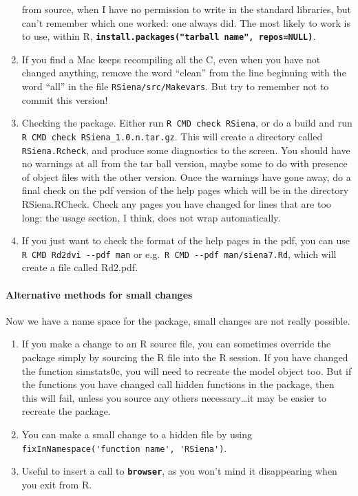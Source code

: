 \documentclass[12pt, a4paper]{article}
\renewcommand{\=}{\,=\,}
\newcommand{\+}{\,+\,}
\newcommand{\sfn}[1]{\textbf{\texttt{#1}}}
\begin{document}
\begin{enumerate}
  from source, when I have no permission to write in the standard libraries, but
  can't remember which one worked: one always did. The most likely to work is to
  use, within R, \sfn{install.packages("tarball name", repos=NULL)}.
\item If you find a Mac keeps recompiling all the C, even when you have not
  changed anything, remove the word ``clean'' from the line beginning with the
  word ``all'' in the file \verb|RSiena/src/Makevars|. But try to remember not
  to commit this version!
\item Checking the package. Either run \verb|R CMD check RSiena|, or do a build
  and run \verb|R CMD check RSiena_1.0.n.tar.gz|. This will create a directory
  called \verb|RSiena.Rcheck|, and produce some diagnostics to the screen. You
  should have no warnings at all from the tar ball version, maybe some to do
  with presence of object files with the other version. Once the warnings have
  gone away, do a final check on the pdf version of the help pages which will be
  in the directory RSiena.RCheck. Check any pages you have changed for lines
  that are too long: the usage section, I think, does not wrap automatically.
\item If you just want to check the format of the help pages in  the pdf, you
  can use
\verb|R CMD Rd2dvi --pdf man| or e.g.\ \verb|R CMD --pdf man/siena7.Rd|, which
will create a file called Rd2.pdf.
\end{enumerate}
\paragraph{Alternative methods for small changes}
Now we have a \textsf{name space} for the package, small changes are not really
possible.
\begin{enumerate}
\item If you make a change to an R source file, you can sometimes override the
  package simply by sourcing the R file into the R session. If you have changed
  the function \textsf{simstats0c}, you will need to recreate the model object
  too. But if the functions you have changed call hidden functions in the
  package, then this will fail, unless you source any others necessary\ldots it
  may be easier to recreate the package.
\item You can make a small change to a hidden file by using
\verb|fixInNamespace('function name', 'RSiena')|.
\item Useful to insert a call to \sfn{browser}, as you won't mind it
  disappearing when you exit from R.
\end{enumerate}
\end{document}
